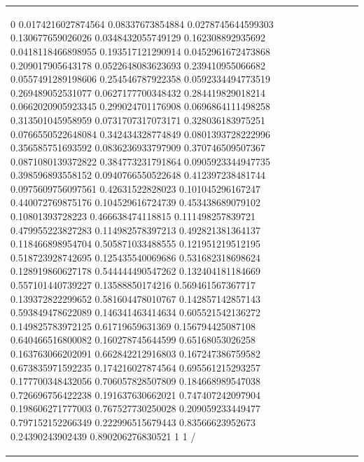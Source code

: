 \documentclass[runningheads]{llncs}\usepackage[]{graphicx}\usepackage[]{color}
\renewcommand{\sparklineheight}{2}
\begin{document}
\begin{table}[ht]
\begin{tabular}{l|p{2.2cm}p{2.2cm}p{2.2cm}p{2.2cm}}
{\begin{sparkline}{10}
\spark 0 0 0.0174216027874564 0.08337673854884 0.0278745644599303 0.130677659026026 0.0348432055749129 0.162308892935692 0.0418118466898955 0.193517121290914 0.0452961672473868 0.209017905643178 0.0522648083623693 0.239410955066682 0.0557491289198606 0.254546787922358 0.0592334494773519 0.269489052531077 0.0627177700348432 0.284419829018214 0.0662020905923345 0.299024701176908 0.0696864111498258 0.313501045958959 0.0731707317073171 0.328036183975251 0.0766550522648084 0.342434328774849 0.0801393728222996 0.356585751693592 0.0836236933797909 0.370746509507367 0.0871080139372822 0.384773231791864 0.0905923344947735 0.398596893558152 0.0940766550522648 0.412397238481744 0.0975609756097561 0.42631522828023 0.101045296167247 0.440072769875176 0.104529616724739 0.453438689079102 0.10801393728223 0.466638474118815 0.111498257839721 0.479955223827283 0.114982578397213 0.492821381364137 0.118466898954704 0.505871033488555 0.121951219512195 0.518723928742695 0.125435540069686 0.531682318698624 0.128919860627178 0.544444490547262 0.132404181184669 0.557101440739227 0.13588850174216 0.569461567367717 0.139372822299652 0.581604478010767 0.142857142857143 0.593849478622089 0.146341463414634 0.605521542136272 0.149825783972125 0.61719659631369 0.156794425087108 0.640466516800082 0.160278745644599 0.65168053026258 0.163763066202091 0.662842212916803 0.167247386759582 0.673835971592235 0.174216027874564 0.695561215293257 0.177700348432056 0.706057828507809 0.184668989547038 0.726696756422238 0.191637630662021 0.747407242097904 0.198606271777003 0.767527730250028 0.209059233449477 0.797152152266349 0.222996515679443 0.83566623952673 0.24390243902439 0.890206276830521 1 1 /
\end{sparkline}} & {\renewcommand{\sparklineheight}{3}\definecolor{sparklinecolor}{named}{black}\begin{sparkline}{10}

\end{sparkline}}
\end{tabular}
\end{table}
\end{document}
